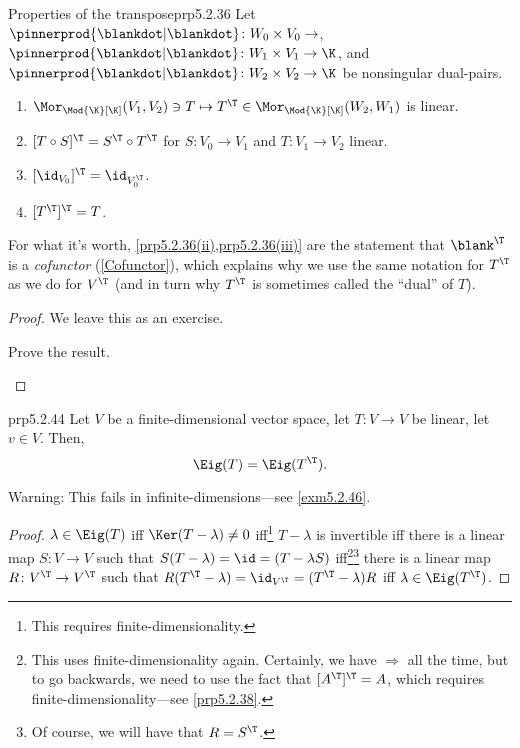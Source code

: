 \begin{prp}{Properties of the transpose}{prp5.2.36}
	Let $\pinnerprod{\blankdot |\blankdot}\colon W_0\times V_0\rightarrow$, $\pinnerprod{\blankdot |\blankdot}\colon W_1\times V_1\rightarrow \K$, and $\pinnerprod{\blankdot |\blankdot}\colon W_2\times V_2\rightarrow \K$ be nonsingular dual-pairs.
	\begin{enumerate}
		\item \label{prp5.2.36(i)}$\Mor _{\Mod{\K}[\K]}(V_1,V_2)\ni T\mapsto T^{\T}\in \Mor _{\Mod{\K}[\K]}(W_2,W_1)$ is linear.
		\item \label{prp5.2.36(ii)}$[T\circ S]^{\T}=S^{\T}\circ T^{\T}$ for $S\colon V_0\rightarrow V_1$ and $T\colon V_1\rightarrow V_2$ linear.
		\item \label{prp5.2.36(iii)}$[\id _{V_0}]^{\T}=\id _{V_0^{\T}}$.
		\item \label{prp5.2.36(iv)}$[T^{\T}]^{\T}=T$.
	\end{enumerate}
	\begin{rmk}
		For what it's worth, \cref{prp5.2.36(ii),prp5.2.36(iii)} are the statement that $\blank ^{\T}$ is a \emph{cofunctor} (\cref{Cofunctor}), which explains why we use the same notation for $T^{\T}$ as we do for $V^{\T}$ (and in turn why $T^{\T}$ is sometimes called the ``dual'' of $T$).
	\end{rmk}
	\begin{proof}
		We leave this as an exercise.
		\begin{exr}[breakable=false]{}{}
			Prove the result.
		\end{exr}
	\end{proof}
\end{prp}
\begin{prp}{}{prp5.2.44}
	Let $V$ be a finite-dimensional vector space, let $T\colon V\rightarrow V$ be linear, let $v\in V$.  Then,
	\begin{equation}
		\Eig (T)=\Eig (T^{\T}).
	\end{equation}
	\begin{rmk}
		Warning:  This fails in infinite-dimensions---see \cref{exm5.2.46}.
	\end{rmk}
	\begin{proof}
		$\lambda \in \Eig (T)$ iff $\Ker (T-\lambda )\neq 0$ iff\footnote{This requires finite-dimensionality.} $T-\lambda$ is invertible iff there is a linear map $S\colon V\rightarrow V$ such that $S(T-\lambda )=\id =(T-\lambda S)$ iff\footnote{This uses finite-dimensionality again.  Certainly, we have $\Rightarrow$ all the time, but to go backwards, we need to use the fact that $[A^{\T}]^{\T}=A$, which requires finite-dimensionality---see \cref{prp5.2.38}.}\footnote{Of course, we will have that $R=S^{\T}$.} there is a linear map $R\colon V^{\T}\rightarrow V^{\T}$ such that $R(T^{\T}-\lambda )=\id _{V^{\T}}=(T^{\T}-\lambda )R$ iff \textellipsis $\lambda \in \Eig (T^{\T})$.
	\end{proof}
\end{prp}

